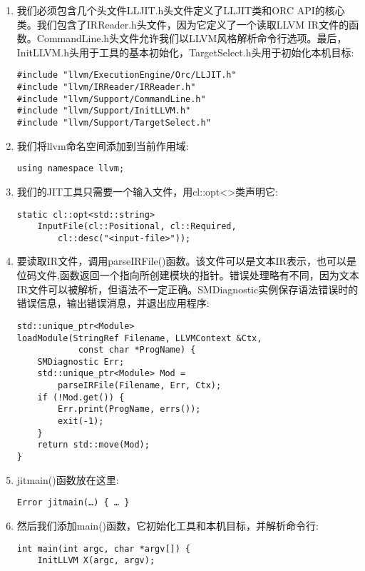 \begin{enumerate}
\item 我们必须包含几个头文件LLJIT.h头文件定义了LLJIT类和ORC API的核心类。我们包含了IRReader.h头文件，因为它定义了一个读取LLVM IR文件的函数。CommandLine.h头文件允许我们以LLVM风格解析命令行选项。最后，InitLLVM.h头用于工具的基本初始化，TargetSelect.h头用于初始化本机目标:
\begin{lstlisting}[caption={}]
#include "llvm/ExecutionEngine/Orc/LLJIT.h"
#include "llvm/IRReader/IRReader.h"
#include "llvm/Support/CommandLine.h"
#include "llvm/Support/InitLLVM.h"
#include "llvm/Support/TargetSelect.h"
\end{lstlisting}

\item 我们将llvm命名空间添加到当前作用域:
\begin{lstlisting}[caption={}]
using namespace llvm;
\end{lstlisting}

\item 我们的JIT工具只需要一个输入文件，用cl::opt<>类声明它:
\begin{lstlisting}[caption={}]
static cl::opt<std::string>
	InputFile(cl::Positional, cl::Required,
		cl::desc("<input-file>"));
\end{lstlisting}

\item 要读取IR文件，调用parseIRFile()函数。该文件可以是文本IR表示，也可以是位码文件,函数返回一个指向所创建模块的指针。错误处理略有不同，因为文本IR文件可以被解析，但语法不一定正确。SMDiagnostic实例保存语法错误时的错误信息，输出错误消息，并退出应用程序:
\begin{lstlisting}[caption={}]
std::unique_ptr<Module>
loadModule(StringRef Filename, LLVMContext &Ctx,
			const char *ProgName) {
	SMDiagnostic Err;
	std::unique_ptr<Module> Mod =
		parseIRFile(Filename, Err, Ctx);
	if (!Mod.get()) {
		Err.print(ProgName, errs());
		exit(-1);
	}
	return std::move(Mod);
}
\end{lstlisting}

\item jitmain()函数放在这里:
\begin{lstlisting}[caption={}]
Error jitmain(…) { … }
\end{lstlisting}

\item 然后我们添加main()函数，它初始化工具和本机目标，并解析命令行:
\begin{lstlisting}[caption={}]
int main(int argc, char *argv[]) {
	InitLLVM X(argc, argv);
	

\end{lstlisting}
\end{enumerate}
